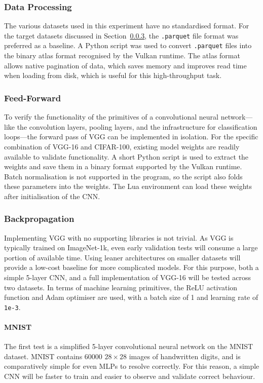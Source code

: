 \documentclass[10pt, a4paper]{article}
\begin{document}
\subsubsection{Data Processing}
The various datasets used in this experiment have no standardised format. For the target datasets discussed in Section~\ref{ssub:backpropagation}, the \texttt{.parquet} file format was preferred as a baseline. A Python script was used to convert \texttt{.parquet} files into the binary atlas format recognised by the Vulkan runtime. The atlas format allows native pagination of data, which saves memory and improves read time when loading from disk, which is useful for this high-throughput task.

\subsubsection{Feed-Forward}
To verify the functionality of the primitives of a convolutional neural network---like the convolution layers, pooling layers, and the infrastructure for classification loops---the forward pass of VGG can be implemented in isolation. For the specific combination of VGG-16 and CIFAR-100, existing model weights are readily available to validate functionality. A short Python script is used to extract the weights and save them in a binary format supported by the Vulkan runtime. Batch normalisation is not supported in the program, so the script also folds these parameters into the weights. The Lua environment can load these weights after initialisation of the CNN.

\subsubsection{Backpropagation}\label{ssub:backpropagation}
Implementing VGG with no supporting libraries is not trivial. As VGG is typically trained on ImageNet-1k, even early validation tests will consume a large portion of available time. Using leaner architectures on smaller datasets will provide a low-cost baseline for more complicated models. For this purpose, both a simple 5-layer CNN, and a full implementation of VGG-16 will be tested across two datasets. In terms of machine learning primitives, the ReLU activation function and Adam optimiser are used, with a batch size of 1 and learning rate of \texttt{1e-3}.

\paragraph{MNIST} The first test is a simplified 5-layer convolutional neural network on the MNIST dataset. MNIST contains 60000 $28\times28$ images of handwritten digits, and is comparatively simple for even MLPs to resolve correctly. For this reason, a simple CNN will be faster to train and easier to observe and validate correct behaviour.
\end{document}
